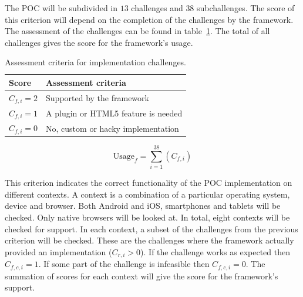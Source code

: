 \documentclass[a4paper]{artikel3}
\newcommand{\setspace}[0]{\vspace{2mm}}
\renewcommand{\paragraph}[1]{\setspace \noindent {\bf #1}  }
\begin{document}

\paragraph{Usage}
The POC will be subdivided in $13$ challenges and $38$ subchallenges.  
The score of this criterion will depend on the completion of the challenges by the framework.  
The assessment of the challenges can be found in table~\ref{table:challenges-scores}.  
The total of all challenges gives the score for the framework's usage.

\begin{table}[h]	
\centering
\begin{tabular}{ll}
\toprule
\textbf{Score} & \textbf{Assessment criteria}\\
\midrule
$C_{f,i} = 2$ & Supported by the framework\\
$C_{f,i} = 1$ & A plugin or HTML5 feature is needed\\
$C_{f,i} = 0$ & No, custom or hacky implementation\\
\bottomrule
\end{tabular}
\caption{Assessment criteria for implementation challenges.}
\label{table:challenges-scores}
\end{table}

\begin{equation}
  \text{Usage}_f = \sum_{i=1}^{38}{\left(C_{f,i}\right)}
  \label{eq:gebruik}
\end{equation}

\paragraph{Support}
This criterion indicates the correct functionality of the POC implementation on different contexts.
A context is a combination of a particular operating system, device and browser.
Both Android and iOS, smartphones and tablets will be checked.
Only native browsers will be looked at.
In total, eight contexts will be checked for support.
In each context,  a subset of the challenges from the previous criterion will be checked.  
These are the challenges where the framework actually provided an implementation ($C_{r,i} > 0$).
If the challenge works as expected then $C_{f,c,i} = 1$.
If some part of the challenge is infeasible then $C_{f,c,i} = 0$.
The summation of scores for each context will give the score for the framework's support.
\end{document}
